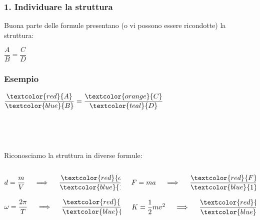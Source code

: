 \documentclass[]{beamer}
\begin{document}
\begin{frame}
\frametitle{1. Individuare la struttura}
Buona parte delle formule presentano (o vi possono essere ricondotte) la struttura:
\begin{center}
\Large \colorbox{blue!30}{$ \dfrac{A}{B} = \dfrac{C}{D}$}
\end{center}
\end{frame}

\begin{frame}
\frametitle{Esempio}
\begin{center}
\Large $ \dfrac{\textcolor{red}{A}}{\textcolor{blue}{B}} = \dfrac{\textcolor{orange}{C}}{\textcolor{teal}{D}}$
\end{center}

~

~

Riconosciamo la struttura in diverse formule:
\begin{columns}
\begin{column}{0.5\textwidth}
\begin{center}
$ d = \dfrac{m}{V} ~~~~ \Longrightarrow ~~~~ \dfrac{\textcolor{red}{d}}{\textcolor{blue}{1}} = \dfrac{\textcolor{orange}{m}}{\textcolor{teal}{V}} $
\end{center}\pause
\begin{center}
$ \omega = \dfrac{2 \pi}{T} ~~~~ \Longrightarrow ~~~~ \dfrac{\textcolor{red}{\omega}}{\textcolor{blue}{1}} = \dfrac{\textcolor{orange}{2\pi}}{\textcolor{teal}{T}} $
\end{center}\pause
\end{column}
\begin{column}{0.5\textwidth}
\begin{center}
$ F = ma ~~~~ \Longrightarrow ~~~~ \dfrac{\textcolor{red}{F}}{\textcolor{blue}{1}} = \dfrac{\textcolor{orange}{ma}}{\textcolor{teal}{1}} $
\end{center}\pause
\begin{center}
$ K = \dfrac{1}{2}mv^2 ~~~~ \Longrightarrow ~~~~ \dfrac{\textcolor{red}{K}}{\textcolor{blue}{1}} = \dfrac{\textcolor{orange}{mv^2}}{\textcolor{teal}{2}} $
\end{center}
\end{column}
\end{columns}
\end{frame}
\end{document}
